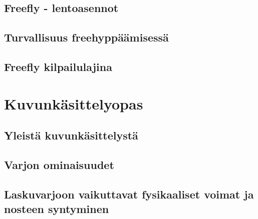 \documentclass[10pt,twoside,openany,hidelinks]{memoir}
\begin{document}
\chapter{Freefly - lentoasennot}
\label{freefly-lentoasennot}
\thispagestyle{headings}
\begin{multicols}{2}
\end{multicols}

\chapter{Turvallisuus freehyppäämisessä}
\label{turvallisuus-freehyppaamisessa}
\thispagestyle{headings}
\begin{multicols}{2}
\end{multicols}

\chapter{Freefly kilpailulajina}
\label{freefly-kilpailulajina}
\thispagestyle{headings}
\begin{multicols}{2}
\end{multicols}

\part{Kuvunkäsittelyopas}\chapter{Yleistä kuvunkäsittelystä}
\label{yleista-kuvunkasittelysta}
\thispagestyle{headings}
\begin{multicols}{2}
\end{multicols}

\chapter{Varjon ominaisuudet}
\label{varjon-ominaisuudet}
\thispagestyle{headings}
\begin{multicols}{2}
\end{multicols}

\chapter{Laskuvarjoon vaikuttavat fysikaaliset voimat ja nosteen syntyminen}
\label{laskuvarjoon-vaikuttavat-fysikaaliset-voimat-ja-nosteen-syntyminen}
\thispagestyle{headings}
\begin{multicols}{2}
\end{multicols}
\end{document}
